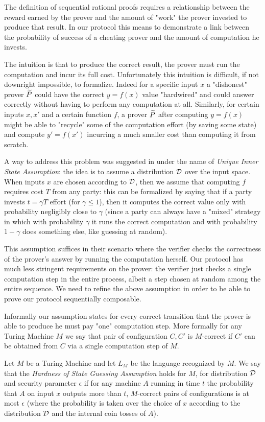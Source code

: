 The definition of sequential rational proofs requires a relationship between the reward earned by the prover and the amount of "work" the prover invested to produce that result. In our protocol this means to demonstrate a link between the probability of success of a cheating prover and the amount of computation he invests.

The intuition is that to produce the correct result, the prover must run the computation and incur its full cost. Unfortunately 
this intuition is difficult, if not downright impossible, to formalize. Indeed for a specific input $x$ a "dishonest" prover $\widetilde{P}$ could have the correct 
$y=f(x)$ value "hardwired" and could answer correctly without having to perform any computation at all. Similarly, for certain inputs $x,x'$ and a certain 
function $f$, a prover $\widetilde{P}$ after computing $y=f(x)$ might be able to "recycle" some of the computation effort (by saving some state) and compute 
$y'=f(x')$ incurring a much smaller cost than computing it from scratch. 

A way to address this problem was suggested in \cite{b08} under the name of {\em Unique Inner State Assumption}: the idea is to assume a distribution 
$\cal D$ over the input space. When inputs $x$ are chosen according to $\cal D$, then we assume that computing $f$ requires cost $T$ from any party: 
this can be formalized by saying that if a party invests $t=\gamma T$ effort (for $\gamma \leq 1$), then it computes the correct value only with
probability negligibly close to $\gamma$ (since 
a party can always have a "mixed" strategy in which with probability $\gamma$ it runs the correct computation and with probability $1-\gamma$ does 
something else, like guessing at random). 

This assumption suffices in their scenario where the verifier checks the correctness of the prover's answer by running the computation herself. Our protocol has much less stringent requirements on the prover: the verifier just checks a single computation step in the entire process, albeit a step chosen at random among the entire sequence. We need to refine the above assumption in order to be able to prove our protocol sequentially composable. 

Informally our assumption states for every correct transition that the prover is able to produce he must pay "one" computation step. More formally for any Turing Machine 
$M$ we say that pair of configuration $C,C'$ is $M$-correct if $C'$ can be obtained from $C$ via a single computation step of $M$. 
\begin{definition}
\label{def:HSGA}
Let $M$ be a Turing Machine and let $L_M$ be the language recognized by $M$. We say that the {\em Hardness of State Guessing Assumption} holds for $M$, for distribution $\cal D$ and security parameter $\epsilon$ if for any machine $A$ running in time $t$ the probability that $A$ on input $x$ outputs more than $t$, $M$-correct pairs of configurations is at most $\epsilon$ (where the probability is taken over the choice of $x$ according to the distribution $\cal D$ and the internal coin tosses of $A$). 
\end{definition}


